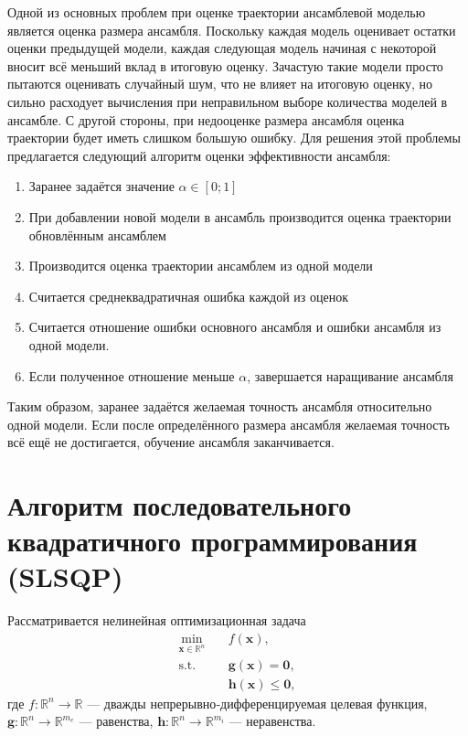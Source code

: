 \documentclass[oneside,senior,etd]{BYUPhys}
\begin{document}
Одной из основных проблем при оценке траектории ансамблевой моделью является оценка размера ансамбля. Поскольку каждая модель оценивает остатки оценки предыдущей модели, каждая следующая модель начиная с некоторой вносит всё меньший вклад в итоговую оценку. Зачастую такие модели просто пытаются оценивать случайный шум, что не влияет на итоговую оценку, но сильно расходует вычисления при неправильном выборе количества моделей в ансамбле. С другой стороны, при недооценке размера ансамбля оценка траектории будет иметь слишком большую ошибку. Для решения этой проблемы предлагается следующий алгоритм оценки эффективности ансамбля:

\begin{enumerate}
	\item Заранее задаётся значение $\alpha \in [0; 1]$
	\item При добавлении новой модели в ансамбль производится оценка траектории обновлённым ансамблем
	\item Производится оценка траектории ансамблем из одной модели
	\item Считается среднеквадратичная ошибка каждой из оценок
	\item Считается отношение ошибки основного ансамбля и ошибки ансамбля из одной модели.
	\item Если полученное отношение меньше $\alpha$, завершается
	      наращивание ансамбля
\end{enumerate}

Таким образом, заранее задаётся желаемая точность ансамбля относительно одной модели. Если после определённого размера ансамбля желаемая точность всё ещё не достигается, обучение ансамбля заканчивается.

\newpage

\section{Алгоритм последовательного квадратичного программирования (SLSQP)}
Рассматривается нелинейная оптимизационная задача
\begin{equation}\label{eq:nlopt}
	\begin{aligned}
		\min_{\bm x\in\mathbb R^{n}}\quad & f(\bm x),               \\
		\text{s.t.}\quad
		                                  & \bm g(\bm x) = \bm 0,   \\
		                                  & \bm h(\bm x) \le \bm 0,
	\end{aligned}
\end{equation}
где $f:\mathbb R^{n}\!\to\!\mathbb R$ — дважды непрерывно‑дифференцируемая целевая функция,
$\bm g:\mathbb R^{n}\!\to\!\mathbb R^{m_e}$ — равенства,
$\bm h:\mathbb R^{n}\!\to\!\mathbb R^{m_i}$ — неравенства.
\end{document}
